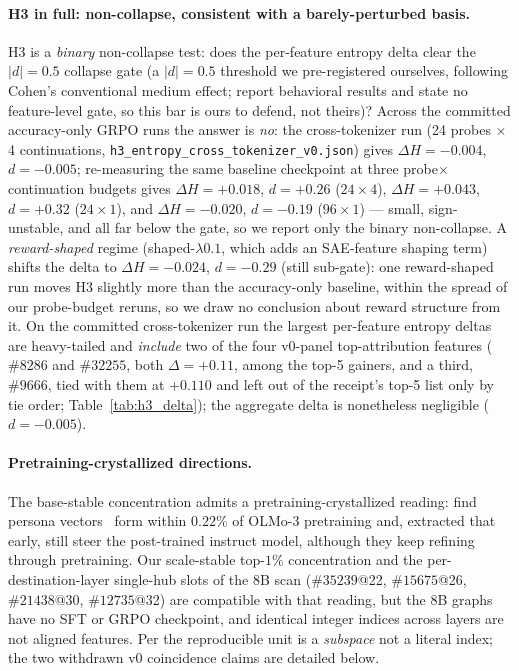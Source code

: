 \documentclass{article}
\begin{document}
\paragraph{H3 in full: non-collapse, consistent with a barely-perturbed basis.}
H3 is a \emph{binary} non-collapse test: does the per-feature entropy delta clear the $|d|=0.5$ collapse gate (a $|d|=0.5$ threshold we pre-registered ourselves, following Cohen's conventional medium effect; \citet{yue2025,wang2025} report behavioral results and state no feature-level gate, so this bar is ours to defend, not theirs)? Across the committed accuracy-only GRPO runs the answer is \emph{no}: the cross-tokenizer run (24 probes $\times$ 4 continuations, \texttt{h3\_entropy\_cross\_tokenizer\_v0.json}) gives $\Delta H=-0.004$, $d=-0.005$; re-measuring the same baseline checkpoint at three probe${\times}$continuation budgets gives $\Delta H=+0.018$, $d=+0.26$ ($24{\times}4$), $\Delta H=+0.043$, $d=+0.32$ ($24{\times}1$), and $\Delta H=-0.020$, $d=-0.19$ ($96{\times}1$) --- small, sign-unstable, and all far below the gate, so we report only the binary non-collapse. A \emph{reward-shaped} regime (shaped-$\lambda0.1$, which adds an SAE-feature shaping term) shifts the delta to $\Delta H=-0.024$, $d=-0.29$ (still sub-gate): one reward-shaped run moves H3 slightly more than the accuracy-only baseline, within the spread of our probe-budget reruns, so we draw no conclusion about reward structure from it. On the committed cross-tokenizer run the largest per-feature entropy deltas are heavy-tailed and \emph{include} two of the four v0-panel top-attribution features ($\#8286$ and $\#32255$, both $\Delta=+0.11$, among the top-5 gainers, and a third, $\#9666$, tied with them at $+0.110$ and left out of the receipt's top-5 list only by tie order; Table~\ref{tab:h3_delta}); the aggregate delta is nonetheless negligible ($d=-0.005$).

\paragraph{Pretraining-crystallized directions.}
The base-stable concentration admits a pretraining-crystallized reading: \citet{moskvoretskii2026persona} find persona vectors~\citep{chen2025persona_vectors} form within $0.22\%$ of OLMo-3 pretraining and, extracted that early, still steer the post-trained instruct model, although they keep refining through pretraining. Our scale-stable top-$1\%$ concentration and the per-destination-layer single-hub slots of the 8B scan ($\#35239$@22, $\#15675$@26, $\#21438$@30, $\#12735$@32) are compatible with that reading, but the 8B graphs have no SFT or GRPO checkpoint, and identical integer indices across layers are not aligned features. Per \citet{unstable_subspaces2026} the reproducible unit is a \emph{subspace} not a literal index; the two withdrawn v0 coincidence claims are detailed below.
\end{document}
